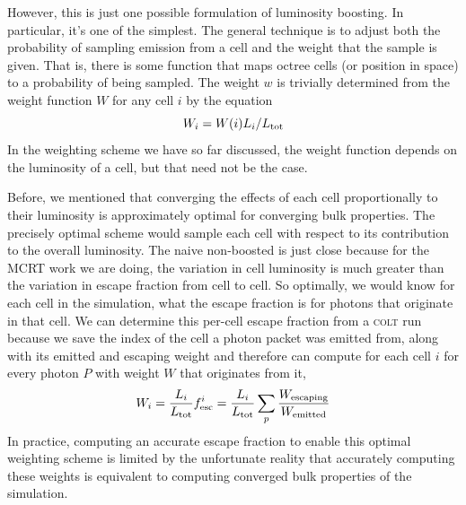 However, this is just one possible formulation of luminosity boosting.
In particular, it's one of the simplest.
The general technique is to adjust both the probability of sampling emission from a cell and the weight that the sample is given.
That is, there is some function that maps octree cells (or position in space) to a probability of being sampled.
The weight $w$ is trivially determined from the weight function $W$ for any cell $i$ by the equation
\begin{equation}
    W_{i} = W(i)L_{i} / L_{\rm tot}
\end{equation}
In the weighting scheme we have so far discussed, the weight function depends on the luminosity of a cell, but that need not be the case.

Before, we mentioned that converging the effects of each cell proportionally to their luminosity is approximately optimal for converging bulk properties.
The precisely optimal scheme would sample each cell with respect to its contribution to the overall luminosity.
The naive non-boosted is just close because for the MCRT work we are doing, the variation in cell luminosity is much greater than the variation in escape fraction from cell to cell.
So optimally, we would know for each cell in the simulation, what the escape fraction is for photons that originate in that cell.
We can determine this per-cell escape fraction from a \textsc{colt} run because we save the index of the cell a photon packet was emitted from, along with its emitted and escaping weight and therefore can compute for each cell $i$ for every photon $P$ with weight $W$ that originates from it,
\begin{equation}
    W_{i} = \frac{L_{i}}{L_{\rm tot}}f_{\rm esc}^{i} =\frac{L_{i}}{L_{\rm tot}} \sum_{p}\frac{W_{\rm escaping}}{W_{\rm emitted}}
\end{equation}
In practice, computing an accurate escape fraction to enable this optimal weighting scheme is limited by the unfortunate reality that accurately computing these weights is equivalent to computing converged bulk properties of the simulation.\\

